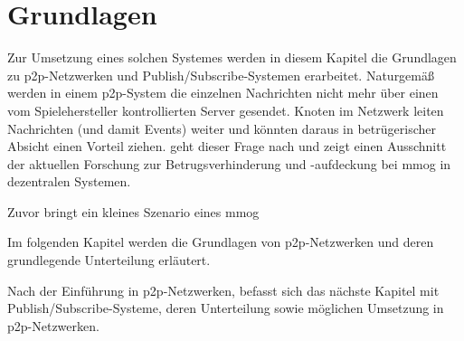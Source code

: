 \chapter{Grundlagen}
\label{chap:grundlagen}


Zur Umsetzung eines solchen Systemes werden in diesem Kapitel die Grundlagen zu \ac{p2p}-Netzwerken und Publish/Subscribe-Systemen erarbeitet. Naturgemäß werden in einem \ac{p2p}-System die einzelnen Nachrichten nicht mehr über einen vom Spielehersteller kontrollierten Server gesendet. Knoten im Netzwerk leiten Nachrichten (und damit Events) weiter und könnten daraus in betrügerischer Absicht einen Vorteil ziehen.  geht dieser Frage nach und zeigt einen Ausschnitt der aktuellen Forschung zur Betrugsverhinderung und -aufdeckung bei \ac{mmog} in dezentralen Systemen.

Zuvor bringt ein kleines Szenario eines \ac{mmog} 


Im folgenden Kapitel werden die Grundlagen von \ac{p2p}-Netzwerken und deren grundlegende Unterteilung erläutert.







Nach der Einführung in \ac{p2p}-Netzwerken, befasst sich das nächste Kapitel mit Publish/Subscribe-Systeme, deren Unterteilung sowie möglichen Umsetzung in \ac{p2p}-Netzwerken. 


